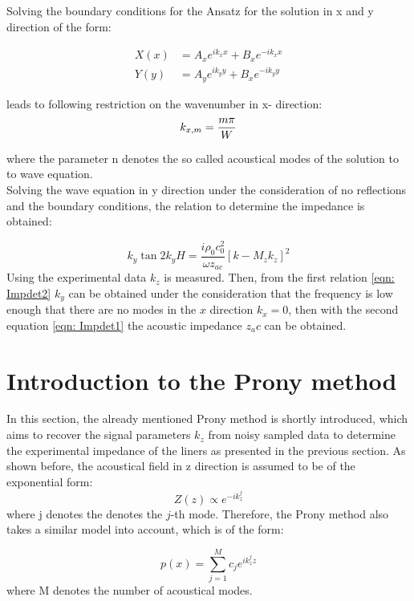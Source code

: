 \documentclass[11pt]{report} %
\begin{document}
Solving the boundary conditions for the Ansatz for the solution in x and y direction of the form: 

\begin{subequations}
\begin{align}
X(x)&=A_xe^{ik_xx}+B_xe^{-ik_xx}\\
Y(y)&=A_ye^{ik_yy}+B_xe^{-ik_yy}
\end{align}
\end{subequations}
 
leads to following restriction on the wavenumber in x- direction: 
\begin{equation}
k_{x,m}=\frac{m\pi}{W}\\
\end{equation}

where the parameter n denotes the so called acoustical modes of the solution to to wave equation.\\
Solving the wave equation in y direction under the consideration of no reflections and the boundary conditions, the relation to determine the impedance is obtained: 

\begin{equation}\label{eqn: Impdet1}
    k_y \tan 2k_y H = \frac{i \rho_0 c_0^2}{\omega z_{ac}} \left[k-M_zk_z\right]^2
\end{equation}
Using the experimental data $k_z$ is measured. 
Then, from the first relation \ref{eqn: Impdet2} $k_y$ can be obtained under the consideration that the frequency is low enough that there are no modes in the $x$ direction $k_x = 0$, then with the second equation \ref{eqn: Impdet1} the acoustic impedance $z_ac$ can be obtained.

\section{Introduction to the Prony method}
In this section, the already mentioned Prony method is shortly introduced, which aims to recover the signal parameters $k_z$ from noisy sampled data to determine the experimental impedance of the liners as presented in the previous section.
As shown before, the acoustical field in z direction is assumed to be of the exponential form:
\begin{equation}
Z(z)\propto e^{-ik_z^j}
\end{equation}
where j denotes the denotes the $j$-th mode. 
Therefore, the Prony method also takes a similar model into account, which is of the form: 

\begin{equation}\label{eqn: expsum}
 p(x)=\sum\limits_{j=1}^M c_{j}e^{ik_z^jz} 
\end{equation}
where M denotes the number of acoustical modes. 
\end{document}
